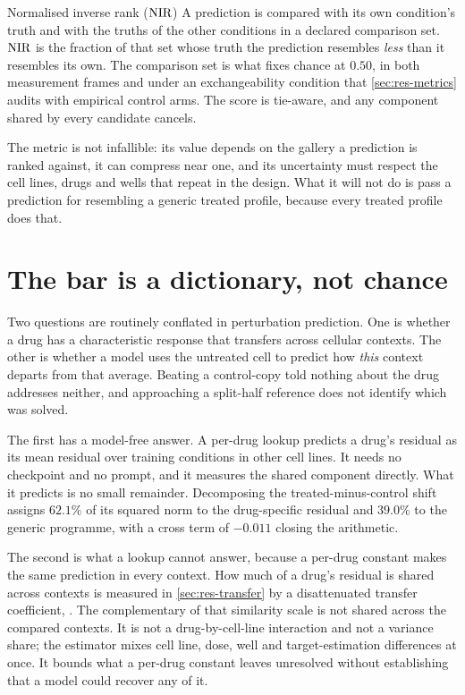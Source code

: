 \begin{defn}{Normalised inverse rank ($\textrm{NIR}$)}
A prediction is compared with its own condition's truth and with the truths of
the other conditions in a declared comparison set. $\textrm{NIR}$ is the fraction of that
set whose truth the prediction resembles \emph{less} than it resembles its own.
The comparison set is what fixes chance at $0.50$, in both measurement frames and
under an exchangeability condition that \cref{sec:res-metrics} audits with
empirical control arms. The score is tie-aware, and any component shared by every
candidate cancels.
\end{defn}

The metric is not infallible: its value depends on the gallery a prediction is
ranked against, it can compress near one, and its uncertainty must respect the
cell lines, drugs and wells that repeat in the design. What it will not do is
pass a prediction for resembling a generic treated profile, because every
treated profile does that.

\section{The bar is a dictionary, not chance}
\label{sec:intro-bar}

Two questions are routinely conflated in perturbation prediction. One is whether
a drug has a characteristic response that transfers across cellular contexts.
The other is whether a model uses the untreated cell to predict how \emph{this}
context departs from that average. Beating a control-copy told nothing about the
drug addresses neither, and approaching a split-half reference does not identify
which was solved.

The first has a model-free answer. A per-drug lookup predicts a
drug's residual as its mean residual over training conditions in other cell
lines. It needs no checkpoint and no prompt, and it measures the shared
component directly. What it predicts is no small remainder.
Decomposing the treated-minus-control shift assigns $62.1\%$ of its squared
norm to the drug-specific residual and $39.0\%$ to the generic programme, with
a cross term of $-0.011$ closing the arithmetic.

The second is what a lookup cannot answer, because a per-drug constant makes the
same prediction in every context. How much of a drug's residual is shared across
contexts is measured in \cref{sec:res-transfer} by a disattenuated transfer
coefficient, . The complementary
 of that similarity scale is not shared across the
compared contexts. It is not a drug-by-cell-line interaction and not a variance
share; the estimator mixes cell line, dose, well and target-estimation
differences at once. It bounds what a per-drug constant leaves unresolved
without establishing that a model could recover any of it.

